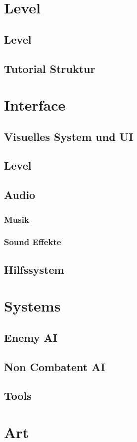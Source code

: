\documentclass[envcountsame,envcountchap deutsch]{i-studis}
\begin{document}
\chapter{Level}
	\section{Level}
	\section{Tutorial Struktur}
\chapter{Interface}
	\section{Visuelles System und UI}
	\section{Level}
	\section{Audio}
		\subsection{Musik}
		\subsection{Sound Effekte}
	\section{Hilfssystem}
\chapter{Systems}
	\section{Enemy AI}
	\section{Non Combatent AI}
	\section{Tools}
\chapter{Art}
\end{document}
